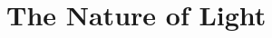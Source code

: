 \documentclass[main.tex]{subfiles}
\begin{document}
    \chapter{The Nature of Light}
        \label{ch: The Nature of Light}
        \thispagestyle{noheader}
\end{document}
